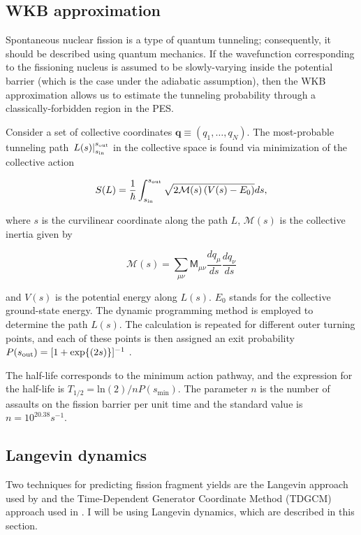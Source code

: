 \subsection{WKB approximation}\label{sect:wkb}
Spontaneous nuclear fission is a type of quantum tunneling; consequently, it should be described using quantum mechanics. If the wavefunction corresponding to the fissioning nucleus is assumed to be slowly-varying inside the potential barrier (which is the case under the adiabatic assumption), then the WKB approximation allows us to estimate the tunneling probability through a classically-forbidden region in the PES.

Consider a set of collective coordinates $\mathbf{q}\equiv(q_1, \ldots, q_N)$. The most-probable tunneling path $\left. L(s) \right|_{s_{\rm in}}^{s_{\rm out}}$ in the collective space is found via minimization of the collective action

\begin{equation}\label{eq:action} 
S(L) = \frac{1}{\hbar}\int_{s_{\rm in}}^{s_{\rm out}} \sqrt{2\mathcal{M}(s)\left(V(s)-E_0\right)}ds,
\end{equation} 

\noindent where $s$ is the curvilinear coordinate along the path $L$,
$\mathcal{M}(s)$ is the collective inertia given by \cite{Sadhukhan2013}

\begin{equation}
\mathcal{M}(s) = \sum_{\mu\nu} \mathsf{M}_{\mu\nu} \frac{dq_\mu}{ds} \frac{dq_\nu}{ds}
\end{equation}

\noindent and $V(s)$ is the potential energy along $L(s)$. $E_0$ stands for the collective ground-state
energy. The dynamic programming method \cite{Baran1981} is employed to determine
the path $L(s)$. The calculation is repeated for different outer turning points,
and each of these points is then assigned an exit  probability $P(s_{\rm out})=[1+\exp{(2s)}]^{-1}$ \cite{Baran1978}. 

The half-life corresponds to the minimum action pathway, and the expression for the half-life is $T_{1/2} = \mathrm{ln}(2)/nP(s_\mathrm{min})$. The parameter $n$ is the number of assaults on the fission barrier per unit time and the standard value is $n=10^{20.38} s^{-1}$.

\subsection{Langevin dynamics}
Two techniques for predicting fission fragment yields are the Langevin approach used by \cite{Sadhukhan2016} and the Time-Dependent Generator Coordinate Method (TDGCM) approach used in \cite{Younes2012}. I will be using Langevin dynamics, which are described in this section.

